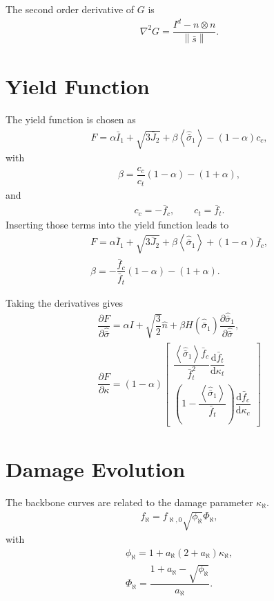 \documentclass[5p]{elsarticle}
\newcommand*{\md}[1]{\mathrm{d}#1}
\newcommand*{\norm}[1]{\left\lVert#1\right\rVert}
\newcommand*{\pdfrac}[2]{\dfrac{\partial#1}{\partial#2}}
\newcommand*{\ddfrac}[2]{\dfrac{\md#1}{\md#2}}
\begin{document}
The second order derivative of $G$ is
\begin{gather}
\nabla^2G=\dfrac{I^d-n\otimes{}n}{\norm{\bar{s}}}.
\end{gather}
\section{Yield Function}
The yield function is chosen as
\begin{gather*}
F=\alpha\bar{I}_1+\sqrt{3\bar{J}_2}+\beta\left<\hat{\bar{\sigma}}_1\right>-\left(1-\alpha\right)c_c,
\end{gather*}
with
\begin{gather*}
\beta=\dfrac{c_c}{c_t}\left(1-\alpha\right)-\left(1+\alpha\right),
\end{gather*}
and
\begin{gather*}
c_c=-\bar{f}_c,\qquad{}c_t=\bar{f}_t.
\end{gather*}
Inserting those terms into the yield function leads to
\begin{gather*}
F=\alpha\bar{I}_1+\sqrt{3\bar{J}_2}+\beta\left<\hat{\bar{\sigma}}_1\right>+\left(1-\alpha\right)\bar{f}_c,\\\beta=-\dfrac{\bar{f}_c}{\bar{f}_t}\left(1-\alpha\right)-\left(1+\alpha\right).
\end{gather*}

Taking the derivatives gives
\begin{gather*}
\pdfrac{F}{\hat{\bar{\sigma}}}=\alpha{}I+\sqrt{\dfrac{3}{2}}\hat{n}+\beta{}H\left(\hat{\bar{\sigma}}_1\right)\pdfrac{\hat{\bar{\sigma}}_1}{\hat{\bar{\sigma}}},\\
\pdfrac{F}{\kappa}=\left(1-\alpha\right)\begin{bmatrix}
\dfrac{\left<\hat{\bar{\sigma}}_1\right>\bar{f}_c}{\bar{f}_t^2}\ddfrac{\bar{f}_t}{\kappa_t}\\[4mm]
\left(1-\dfrac{\left<\hat{\bar{\sigma}}_1\right>}{\bar{f}_t}\right)\ddfrac{\bar{f}_c}{\kappa_c}
\end{bmatrix}
\end{gather*}
\section{Damage Evolution}
The backbone curves are related to the damage parameter $\kappa_\aleph$.
\begin{gather*}
f_\aleph=f_{\aleph,0}\sqrt{\phi_\aleph}\Phi_\aleph,
\end{gather*}
with
\begin{gather*}
\phi_\aleph=1+a_\aleph\left(2+a_\aleph\right)\kappa_\aleph,\\
\Phi_\aleph=\dfrac{1+a_\aleph-\sqrt{\phi_\aleph}}{a_\aleph}.
\end{gather*}
\end{document}
